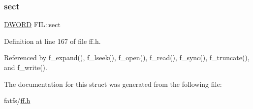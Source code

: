 \mbox{\label{structFIL_affec18b48fe716fdae6a60123fc61145}} 
\subsubsection{\texorpdfstring{sect}{sect}}
{\footnotesize\ttfamily \hyperlink{integer_8h_ad342ac907eb044443153a22f964bf0af}{D\+W\+O\+RD} F\+I\+L\+::sect}



Definition at line 167 of file ff.\+h.



Referenced by f\+\_\+expand(), f\+\_\+lseek(), f\+\_\+open(), f\+\_\+read(), f\+\_\+sync(), f\+\_\+truncate(), and f\+\_\+write().



The documentation for this struct was generated from the following file\+:\begin{DoxyCompactItemize}
\item 
fatfs/\hyperlink{ff_8h}{ff.\+h}\end{DoxyCompactItemize}
